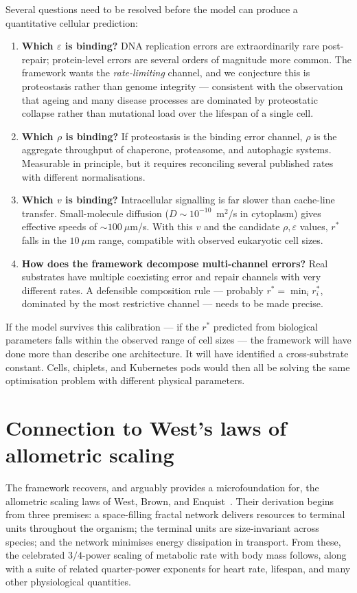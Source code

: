 \documentclass[11pt]{article}
\begin{document}
Several questions need to be resolved before the model can produce a quantitative cellular prediction:
\begin{enumerate}[itemsep=2pt,topsep=2pt]
\item \textbf{Which $\varepsilon$ is binding?} DNA replication errors are extraordinarily rare post-repair; protein-level errors are several orders of magnitude more common. The framework wants the \emph{rate-limiting} channel, and we conjecture this is proteostasis rather than genome integrity --- consistent with the observation that ageing and many disease processes are dominated by proteostatic collapse rather than mutational load over the lifespan of a single cell.
\item \textbf{Which $\rho$ is binding?} If proteostasis is the binding error channel, $\rho$ is the aggregate throughput of chaperone, proteasome, and autophagic systems. Measurable in principle, but it requires reconciling several published rates with different normalisations.
\item \textbf{Which $v$ is binding?} Intracellular signalling is far slower than cache-line transfer. Small-molecule diffusion ($D \sim 10^{-10}$~m$^2$/s in cytoplasm) gives effective speeds of $\sim 100~\mu$m/s. With this $v$ and the candidate $\rho, \varepsilon$ values, $r^{\ast}$ falls in the $10~\mu$m range, compatible with observed eukaryotic cell sizes.
\item \textbf{How does the framework decompose multi-channel errors?} Real substrates have multiple coexisting error and repair channels with very different rates. A defensible composition rule --- probably $r^{\ast} = \min_i r^{\ast}_i$, dominated by the most restrictive channel --- needs to be made precise.
\end{enumerate}

If the model survives this calibration --- if the $r^{\ast}$ predicted from biological parameters falls within the observed range of cell sizes --- the framework will have done more than describe one architecture. It will have identified a cross-substrate constant. Cells, chiplets, and Kubernetes pods would then all be solving the same optimisation problem with different physical parameters.

\section{Connection to West's laws of allometric scaling}

The framework recovers, and arguably provides a microfoundation for, the allometric scaling laws of West, Brown, and Enquist~\cite{west-1997,west-book}. Their derivation begins from three premises: a space-filling fractal network delivers resources to terminal units throughout the organism; the terminal units are size-invariant across species; and the network minimises energy dissipation in transport. From these, the celebrated $3/4$-power scaling of metabolic rate with body mass follows, along with a suite of related quarter-power exponents for heart rate, lifespan, and many other physiological quantities.
\end{document}
